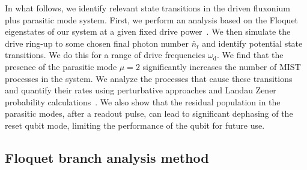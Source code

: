 \documentclass[%
reprint,
superscriptaddress,
 amsmath,amssymb,
 aps,
 prx,
longbibliography,
floatfix,
]{revtex4-2}
\begin{document}
In what follows, we identify relevant state transitions in the driven fluxonium plus parasitic mode system. First, we perform an analysis based on the Floquet eigenstates of our system at a given fixed drive power~\cite{khezri2023measurement,cohen2023reminiscence,dumas2024unified}. We then simulate the drive ring-up to some chosen final photon number $\bar{n}_\textrm{r}$ and identify potential state transitions. We do this for a range of drive frequencies $\omega_\textrm{d}$. We find that the presence of the parasitic mode $\mu=2$ significantly increases the number of MIST processes in the system. We analyze the processes that cause these transitions and quantify their rates using perturbative approaches and Landau Zener probability calculations~\cite{ikeda2022floquet}. We also show that the residual population in the parasitic modes, after a readout pulse, can lead to significant dephasing of the reset qubit mode, limiting the performance of the qubit for future use.

\subsection{Floquet branch analysis method} 
\end{document}
